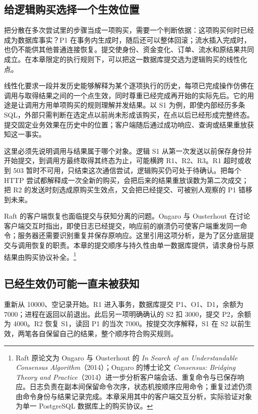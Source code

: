\subsection*{给逻辑购买选择一个生效位置}

把分散在多次尝试里的步骤当成一项购买，需要一个判断依据：这项购买何时已经成为数据库事实？P1 在事务内生成时，随后还可以整体回滚；流水插入完成时，也仍不能供其他普通连接恢复。提交使身份、资金变化、订单、流水和原结果共同成立。在本章限定的执行规则下，可以把这一数据库提交选为逻辑购买的线性化点。

线性化要求一段并发历史能够解释为某个逐项执行的历史，每项已完成操作仿佛在调用与取得结果之间的一个点生效，同时尊重已经完成再开始的实际先后。它的用途是让调用方用单项购买的规则理解并发结果。以 S1 为例，即使内部经历多条 SQL，外部只需判断在选定点以前尚未形成该购买，在点以后已经形成完整终态。提交固定业务效果在历史中的位置；客户端随后通过成功响应、查询或结果重放获知这一事实。

这里必须先说明调用与结果属于哪个对象。逻辑 S1 从第一次发送以前保存身份并开始提交，到调用方最终取得其终态为止，可能横跨 R1、R2、R3。R1 超时或收到 503 暂时不可用，只结束这次通信尝试，逻辑购买仍可处于待确认。把每个 HTTP 尝试都解释成一次全新的购买，会把后来的结果重放误数为第二次成交；把 R2 的发送时刻选成原购买生效点，又会把已经提交、可被别人观察的 P1 错移到未来。

Raft 的客户端恢复也面临提交与获知分离的问题。Ongaro 与 Ousterhout 在讨论客户端交互时指出，即使日志已经提交，响应前的崩溃仍可使客户端重发同一命令；服务器还需要识别重复并保存原响应\cite{raft,ongaro}。这里引用这项分析，是为了区分底层提交与调用恢复的职责。本章的提交顺序与持久性由单一数据库提供，请求身份与原结果由购买协议补全。\footnote{Raft 原论文为 Ongaro 与 Ousterhout 的 \textit{In Search of an Understandable Consensus Algorithm}（2014）；Ongaro 的博士论文 \textit{Consensus: Bridging Theory and Practice}（2014）进一步分析客户端会话、重复命令与已保存响应。日志负责在副本间保留命令次序，状态机按顺序应用命令；重复过滤仍须由命令身份与结果记录完成。本章采用其中的客户端交互分析，实际验证对象为单一 PostgreSQL 数据库上的购买协议。}

\subsection*{已经生效仍可能一直未被获知}

重新从 10000、空记录开始。R1 进入事务，数据库提交 P1、O1、D1，余额为 7000；进程在返回以前退出。此后另一项明确确认的 S2 扣 3000，提交 P2，余额为 4000。R2 恢复 S1，读回 P1 的当次 7000。按提交次序解释，S1 在 S2 以前生效，两笔各自保留自己的结果，整个顺序符合购买规则。

